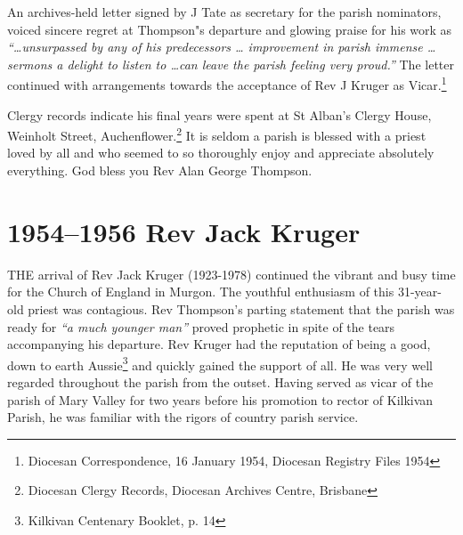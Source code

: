 An archives-held letter signed by J Tate as secretary for the parish nominators, voiced sincere regret at Thompson"s departure and glowing praise for his work as \emph{``\ldots unsurpassed by any of his predecessors \ldots{} improvement in parish immense \ldots{} sermons a delight to listen to \ldots can leave the parish feeling very proud.''} The letter continued with arrangements towards the acceptance of Rev J Kruger as Vicar.\footnote{Diocesan Correspondence, 16 January 1954, Diocesan Registry Files 1954}


Clergy records indicate his final years were spent at St Alban's Clergy House, Weinholt Street, Auchenflower.\footnote{Diocesan Clergy Records, Diocesan Archives Centre, Brisbane} It is seldom a parish is blessed with a priest loved by all and who seemed to so thoroughly enjoy and appreciate absolutely everything. God bless you Rev Alan George Thompson.


\balance


\printendnotes[custom]
\setcounter{endnote}{0}
\chapter{1954--1956 Rev Jack Kruger}
\nobalance


\lettrine[lines=3]{T}{HE}
 arrival of Rev Jack Kruger (1923-1978) continued the vibrant and busy time for the Church of England in Murgon. The youthful enthusiasm of this 31-year-old priest was contagious. Rev Thompson's parting statement that the parish was ready for \emph{``a much younger man''} proved prophetic in spite of the tears accompanying his departure. Rev Kruger had the reputation of being a good, down to earth Aussie\footnote{Kilkivan Centenary Booklet, p. 14} and quickly gained the support of all. He was very well regarded throughout the parish from the outset. Having served as vicar of the parish of Mary Valley for two years before his promotion to rector of Kilkivan Parish, he was familiar with the rigors of country parish service.

